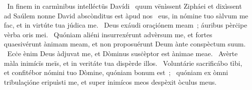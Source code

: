 {~In finem in carmìnibus intelléctüs Davídi ~quum vënìssent Zipháei et dixìssent ad Saúlem nonne David abscònditus est àpud nos}
{%
~eus, in nómine tuo sàlvum me fac, et in virtúte tua júdica me.
~Deus exáudi oraçiónem meam~; áuribus pèrċipe vèrba oris mei.
~Quóniam aliéni insurrexérunt advèrsum me, et fortes quaesivérunt ànimam meam, et non proposuérunt Deum ànte conspèctum suum.
~Ecċe ènim Deus àdjuvat me, et Dòminus susċèptor est ànimae meae.
~Avèrte màla inimícïs meïs, et in veritáte tua dispèrde illos.
~Voluntárie sacrificábo tìbi, et confitébor nómini tuo Dòmine, quóniam bonum est~;
~quóniam ex òmni tribulaçióne eripuìsti me, et super inimícos meos despèxit òculus meus.
}
